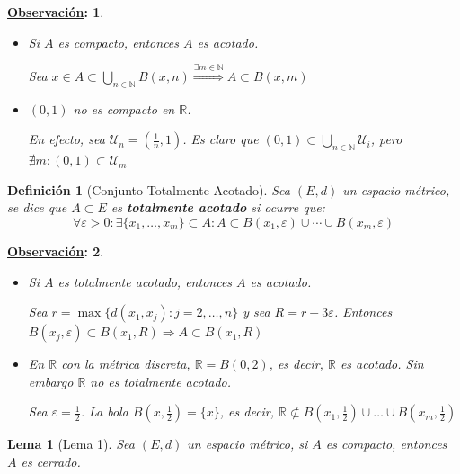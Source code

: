 \documentclass[10pt,a4paper,openright]{book}
\theoremstyle{break}
\newtheorem*{defi}{Definición}
\newtheorem*{lema}{Lema}
\newtheorem*{obs}{\underline{Observación}:}
\begin{document}
\begin{obs}
\begin{itemize}
\item Si $A$ es compacto, entonces $A$ es acotado.

Sea $x \in A \subset \bigcup_{n \in \mathbb{N}} B(x,n) \stackrel{\exists m \in \mathbb{N}}{\Rightarrow} A \subset B(x,m)$

\item $(0,1)$ no es compacto en $\mathbb{R}$.

En efecto, sea $\mathcal{U}_n = (\frac{1}{n}, 1)$. Es claro que $(0,1) \subset \bigcup_{n \in \mathbb{N}} \mathcal{U}_i$, pero $\nexists m : (0,1) \subset \mathcal{U}_m$
\end{itemize}
\end{obs}

\begin{defi}[Conjunto Totalmente Acotado]
Sea $(E,d)$ un espacio métrico, se dice que $A \subset E$ es \textbf{totalmente acotado} si ocurre que:
$$\forall \varepsilon >0: \exists \{x_1, \ldots, x_m\} \subset A : A \subset B(x_1, \varepsilon) \cup \cdots \cup B(x_m, \varepsilon)$$
\end{defi}

\begin{obs}
\begin{itemize}
\item Si $A$ es totalmente acotado, entonces $A$ es acotado.

Sea $r = \max\{d(x_1, x_j) : j = 2, \ldots, n\}$ y sea $R= r + 3 \varepsilon$. Entonces $B(x_j, \varepsilon) \subset B(x_1, R) \Rightarrow A \subset B(x_1, R)$

\item En $\mathbb{R}$ con la métrica discreta, $\mathbb{R} = B(0,2)$, es decir, $\mathbb{R}$ es acotado. Sin embargo $\mathbb{R}$ no es totalmente acotado.

Sea $\varepsilon = \frac{1}{2}$. La bola $B(x, \frac{1}{2}) = \{x\}$, es decir, $\mathbb{R} \not\subset B(x_1, \frac{1}{2}) \cup \ldots \cup B(x_m, \frac{1}{2})$
\end{itemize}
\end{obs}

\begin{lema}[Lema 1]
Sea $(E,d)$ un espacio métrico, si $A$ es compacto, entonces $A$ es cerrado.
\end{lema}
\end{document}
